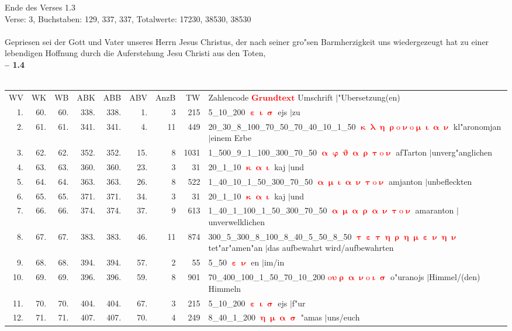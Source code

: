 \documentclass[a4paper,10pt,landscape]{article}
\begin{document}
Ende des Verses 1.3\\
Verse: 3, Buchstaben: 129, 337, 337, Totalwerte: 17230, 38530, 38530\\
\\
Gepriesen sei der Gott und Vater unseres Herrn Jesus Christus, der nach seiner gro"sen Barmherzigkeit uns wiedergezeugt hat zu einer lebendigen Hoffnung durch die Auferstehung Jesu Christi aus den Toten,\\
\newpage 
{\bf -- 1.4}\\
\medskip \\
\begin{tabular}{rrrrrrrrp{120mm}}
WV&WK&WB&ABK&ABB&ABV&AnzB&TW&Zahlencode \textcolor{red}{$\boldsymbol{Grundtext}$} Umschrift $|$"Ubersetzung(en)\\
1.&60.&60.&338.&338.&1.&3&215&5\_10\_200 \textcolor{red}{$\boldsymbol{\upepsilon\upiota\upsigma}$} ejs $|$zu\\
2.&61.&61.&341.&341.&4.&11&449&20\_30\_8\_100\_70\_50\_70\_40\_10\_1\_50 \textcolor{red}{$\boldsymbol{\upkappa\uplambda\upeta\uprho\mathrm{o}\upnu\mathrm{o}\upmu\upiota\upalpha\upnu}$} kl"aronomjan $|$einem Erbe\\
3.&62.&62.&352.&352.&15.&8&1031&1\_500\_9\_1\_100\_300\_70\_50 \textcolor{red}{$\boldsymbol{\upalpha\upvarphi\upvartheta\upalpha\uprho\uptau\mathrm{o}\upnu}$} afTarton $|$unverg"anglichen\\
4.&63.&63.&360.&360.&23.&3&31&20\_1\_10 \textcolor{red}{$\boldsymbol{\upkappa\upalpha\upiota}$} kaj $|$und\\
5.&64.&64.&363.&363.&26.&8&522&1\_40\_10\_1\_50\_300\_70\_50 \textcolor{red}{$\boldsymbol{\upalpha\upmu\upiota\upalpha\upnu\uptau\mathrm{o}\upnu}$} amjanton $|$unbefleckten\\
6.&65.&65.&371.&371.&34.&3&31&20\_1\_10 \textcolor{red}{$\boldsymbol{\upkappa\upalpha\upiota}$} kaj $|$und\\
7.&66.&66.&374.&374.&37.&9&613&1\_40\_1\_100\_1\_50\_300\_70\_50 \textcolor{red}{$\boldsymbol{\upalpha\upmu\upalpha\uprho\upalpha\upnu\uptau\mathrm{o}\upnu}$} amaranton $|$unverwelklichen\\
8.&67.&67.&383.&383.&46.&11&874&300\_5\_300\_8\_100\_8\_40\_5\_50\_8\_50 \textcolor{red}{$\boldsymbol{\uptau\upepsilon\uptau\upeta\uprho\upeta\upmu\upepsilon\upnu\upeta\upnu}$} tet"ar"amen"an $|$das aufbewahrt wird/aufbewahrten\\
9.&68.&68.&394.&394.&57.&2&55&5\_50 \textcolor{red}{$\boldsymbol{\upepsilon\upnu}$} en $|$im/in\\
10.&69.&69.&396.&396.&59.&8&901&70\_400\_100\_1\_50\_70\_10\_200 \textcolor{red}{$\boldsymbol{\mathrm{o}\upsilon\uprho\upalpha\upnu\mathrm{o}\upiota\upsigma}$} o"uranojs $|$Himmel/(den) Himmeln\\
11.&70.&70.&404.&404.&67.&3&215&5\_10\_200 \textcolor{red}{$\boldsymbol{\upepsilon\upiota\upsigma}$} ejs $|$f"ur\\
12.&71.&71.&407.&407.&70.&4&249&8\_40\_1\_200 \textcolor{red}{$\boldsymbol{\upeta\upmu\upalpha\upsigma}$} "amas $|$uns/euch\\
\end{tabular}\medskip \\
\end{document}
